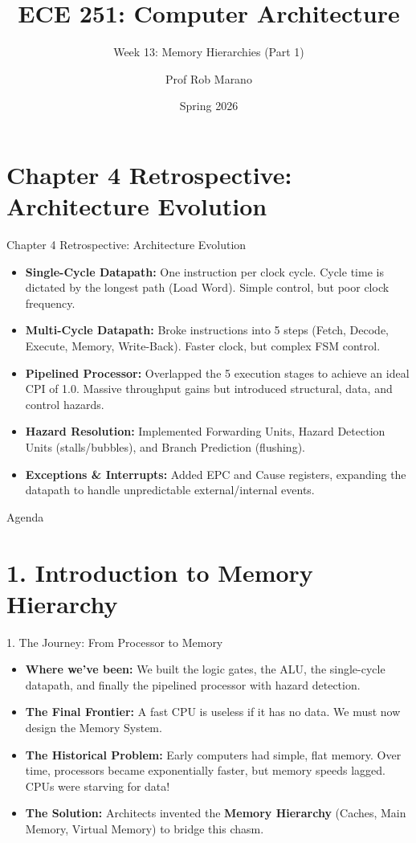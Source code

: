 \documentclass[aspectratio=169]{beamer}
\title{ECE 251: Computer Architecture}
\subtitle{Week 13: Memory Hierarchies (Part 1)}
\author{Prof Rob Marano}
\date{Spring 2026}
\begin{document}
\begin{frame}
  \titlepage
\end{frame}

\section*{Chapter 4 Retrospective: Architecture Evolution}

\begin{frame}{Chapter 4 Retrospective: Architecture Evolution}
\begin{itemize}
    \item \textbf{Single-Cycle Datapath:} One instruction per clock cycle. Cycle time is dictated by the longest path (Load Word). Simple control, but poor clock frequency.
    \item \textbf{Multi-Cycle Datapath:} Broke instructions into 5 steps (Fetch, Decode, Execute, Memory, Write-Back). Faster clock, but complex FSM control.
    \item \textbf{Pipelined Processor:} Overlapped the 5 execution stages to achieve an ideal CPI of 1.0. Massive throughput gains but introduced structural, data, and control hazards.
    \item \textbf{Hazard Resolution:} Implemented Forwarding Units, Hazard Detection Units (stalls/bubbles), and Branch Prediction (flushing).
    \item \textbf{Exceptions \& Interrupts:} Added EPC and Cause registers, expanding the datapath to handle unpredictable external/internal events.
\end{itemize}
\end{frame}

\begin{frame}{Agenda}
  \tableofcontents
\end{frame}

\section{1. Introduction to Memory Hierarchy}

\begin{frame}{1. The Journey: From Processor to Memory}
\begin{itemize}
    \item \textbf{Where we've been:} We built the logic gates, the ALU, the single-cycle datapath, and finally the pipelined processor with hazard detection.
    \vspace{0.3cm}
    \item \textbf{The Final Frontier:} A fast CPU is useless if it has no data. We must now design the Memory System.
    \vspace{0.3cm}
    \item \textbf{The Historical Problem:} Early computers had simple, flat memory. Over time, processors became exponentially faster, but memory speeds lagged. CPUs were starving for data!
    \vspace{0.3cm}
    \item \textbf{The Solution:} Architects invented the \textbf{Memory Hierarchy} (Caches, Main Memory, Virtual Memory) to bridge this chasm.
\end{itemize}
\end{frame}
\end{document}
